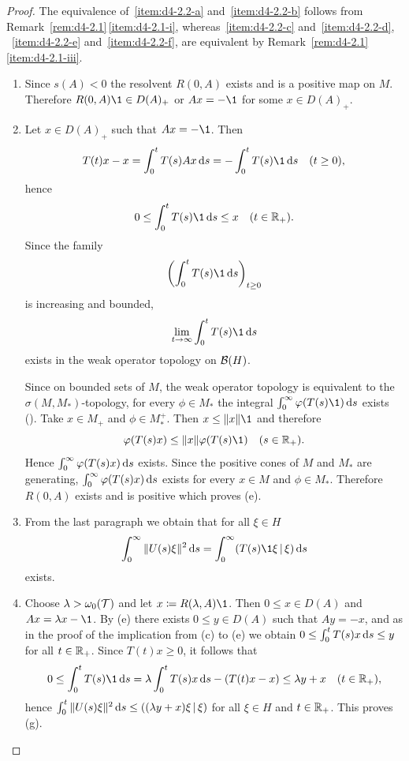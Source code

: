 \begin{proof}
The equivalence of~\ref{item:d4-2.2-a} and~\ref{item:d4-2.2-b} follows from Remark~\ref{rem:d4-2.1}\,\ref{item:d4-2.1-i}, whereas~\ref{item:d4-2.2-c} and~\ref{item:d4-2.2-d}, \resp~\ref{item:d4-2.2-e} and~\ref{item:d4-2.2-f}, are equivalent by Remark~\ref{rem:d4-2.1}\,\ref{item:d4-2.1-iii}.
\begin{enumerate}[wide, labelindent=.25em]

\item[(a) $\implies$ (c):] Since $s(A) < 0$ the resolvent $R(0,A)$ exists and is a positive map on $M$.
Therefore $R(0,A)\1 \in D(A)_{+}$ or $Ax = -\1$ for some $x \in D(A)_{+}$.


\item[(c) $\implies$ (e):] Let $x \in D(A)_{+}$ such that $Ax = -\1$.
Then
\[
T(t)x - x = \int_{0}^{t} T(s)Ax \ds = -\int_{0}^{t} T(s) \1 \ds \quad (t \geq 0),
\]
hence
\[
0 \leq \int_{0}^{t} T(s) \1 \ds \leq x \quad (t \in \R_{+}).
\]
Since the family 
%
\[
	\mleft( \int_{0}^{t} T(s)\1 \ds \mright)_{t \geq 0}
\]
%
is increasing and bounded, 
%
\[
	\lim_{t \to \infty} \int_{0}^{t} T(s) \1 \ds
\]
%
exists in the weak operator topology on $\mathcal{B}(H)$.

Since on bounded sets of\/ $M$, the weak operator topology is equivalent to the $\sigma(M,M_{*})$-topology, for every $\phi \in M_{*}$ the integral $ \int_{0}^{\infty}\phi(T(s) \1) \ds $ exists (\textcite[1.15.2.]{sakai:1971}).
Take $x \in M_{+}$ and $\phi \in M_{*}^{+}$.
Then $x \leq \|x\| \1$ and therefore
\[
	\phi(T(s)x) \leq \|x\|\phi(T(s) \1) \quad (s \in \R_{+}).
\]
Hence $\int_{0}^{\infty} \phi(T(s)x) \ds$ exists.
Since the positive cones of\/ $M$ and $M_{*}$ are generating, $\int_{0}^{\infty}\phi(T(s)x) \ds$ exists for every $x \in M$ and $\phi \in M_{*}$.
Therefore $R(0,A)$ exists and is positive which proves (e).

\item[(c) $\implies$ (g):] From the last paragraph we obtain that for all $\xi \in H$
\[
\int_{0}^{\infty}\|U(s)\xi\|^2 \ds = \int_{0}^{\infty}(T(s)\1\xi \,|\, \xi) \ds
\]
exists.

\item[(e) $\implies$ (g):] Choose $\lambda > \omega_{0}(\mathcal{T})$ and let $x \coloneq R(\lambda,A)\1$.
Then $0 \leq x \in D(A)$ and $Ax = \lambda x - \1$.
By (e) there exists $0 \leq y \in D(A)$ such that $Ay = -x$, and as in the proof of the implication from (c) to (e) we obtain $0 \leq \int_{0}^{t} T(s)x \ds \leq y$ for all $t \in \mathbb{R}_{+}$.
Since $T(t)x \geq 0$, it follows that
\[
0 \leq \int_{0}^{t} T(s)\1 \ds = \lambda \int_{0}^{t} T(s)x \ds - (T(t)x - x) \leq \lambda y + x \quad (t \in \R_{+}),
\]
hence $\int_{0}^{t}\|U(s)\xi\|^2 \ds \leq ((\lambda y + x)\xi \,|\, \xi)$ for all $\xi \in H$ and $t \in \mathbb{R}_{+}$.
This proves (g).


\end{enumerate}
\end{proof}
